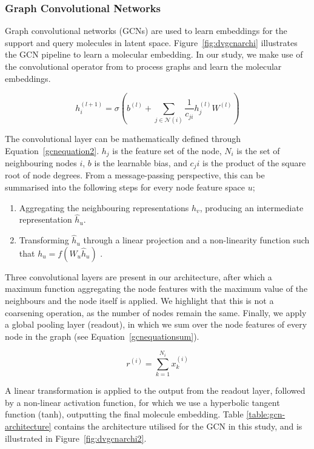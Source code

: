 \subsubsection{Graph Convolutional Networks}

Graph convolutional networks (GCNs) are used to learn embeddings for the support and query molecules in latent space. Figure~\ref{fig:dvgcnarchi} illustrates the GCN pipeline to learn a molecular embedding. In our study, we make use of the convolutional operator from \citet{kipf2016semi} to process graphs and learn the molecular embeddings.

\begin{equation}
	\label{gcnequation2}
	h_i^{(l+1)} = \sigma(b^{(l)} + \sum_{j\in\mathcal{N}(i)}\frac{1}{c_{ji}}h_j^{(l)}W^{(l)})
\end{equation}

The convolutional layer can be mathematically defined through Equation~\ref{gcnequation2}. $h_j$ is the feature set of the node, $N_i$ is the set of neighbouring nodes $i$, $b$ is the learnable bias, and $c_ji$ is the product of the square root of node degrees. From a message-passing perspective, this can be summarised into the following steps for every node feature space $u$;

\begin{enumerate}
	\item Aggregating the neighbouring representations $h_v$, producing an intermediate representation $\hat{h}_u$.
	\item Transforming $\hat{h}_u$ through a linear projection and a non-linearity function such that $h_u = f(W_u \hat{h}_u)$ \citep{kipf2016semi}.
\end{enumerate}

Three convolutional layers are present in our architecture, after which a maximum function aggregating the node features with the maximum value of the neighbours and the node itself is applied. We highlight that this is not a coarsening operation, as the number of nodes remain the same. Finally, we apply a global pooling layer (readout), in which we sum over the node features of every node in the graph (see Equation~\ref{gcnequationsum}). 

\begin{equation}
	\label{gcnequationsum}
	r^{(i)} = \sum_{k=1}^{N_i} x^{(i)}_k
\end{equation}

A linear transformation is applied to the output from the readout layer, followed by a non-linear activation function, for which we use a hyperbolic tangent function (tanh), outputting the final molecule embedding. Table \ref{table:gcn-architecture} contains the architecture utilised for the GCN in this study, and is illustrated in Figure~\ref{fig:dvgcnarchi2}.

